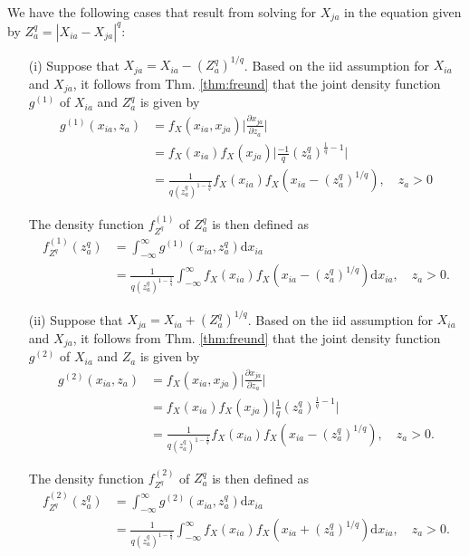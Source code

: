 \documentclass[10pt,letterpaper]{article}\usepackage[]{graphicx}\usepackage[]{color}
\begin{document}
We have the following cases that result from solving for $X_{ja}$ in the equation given by $Z^q_a = |X_{ia} - X_{ja}|^q$:
\begin{itemize}
\item[(i)] Suppose that $X_{ja} = X_{ia} - \left(Z^q_a\right)^{1/q}$. Based on the iid assumption for $X_{ia}$ and $X_{ja}$, it follows from Thm. \ref{thm:freund} that the joint density function $g^{(1)}$ of $X_{ia}$ and $Z^q_a$ is given by
%
\begin{equation}
\begin{aligned}
g^{(1)}(x_{ia},z_a) &= f_X(x_{ia},x_{ja})\biggl|\frac{\partial x_{ja}}{\partial z_a}\biggr| \\
&= f_X(x_{ia})f_X(x_{ja})\biggl|\frac{-1}{q} \left(z^q_a\right)^{\frac{1}{q}-1}\biggr| \\
&= \frac{1}{q \left(z^q_a\right)^{1 - \frac{1}{q}}}f_X(x_{ia})f_X\left(x_{ia}-\left(z^q_a\right)^{1/q}\right), \quad z_a > 0
\end{aligned}
\end{equation}

The density function $f^{(1)}_{Z^q}$ of $Z^q_a$ is then defined as
%
\begin{equation}
\begin{aligned}
f^{(1)}_{Z^q}(z^q_a) &= \int_{-\infty}^{\infty} g^{(1)}(x_{ia},z^q_a)\text{d}x_{ia} \\
&= \frac{1}{q \left(z^q_a\right)^{1 - \frac{1}{q}}}\int_{-\infty}^{\infty} f_X(x_{ia})f_X\left(x_{ia}-\left(z^q_a\right)^{1/q}\right)\text{d}x_{ia}, \quad z_a > 0.
\end{aligned}
\end{equation}

\item[(ii)] Suppose that $X_{ja} = X_{ia} + \left(Z^q_a\right)^{1/q}$. Based on the iid assumption for $X_{ia}$ and $X_{ja}$, it follows from Thm. \ref{thm:freund} that the joint density function $g^{(2)}$ of $X_{ia}$ and $Z_a$ is given by
%
\begin{equation}
\begin{aligned}
g^{(2)}(x_{ia},z_a) &= f_X(x_{ia},x_{ja})\biggl|\frac{\partial x_{ja}}{\partial z_a}\biggr| \\
&= f_X(x_{ia})f_X(x_{ja})\biggl|\frac{1}{q} \left(z^q_a\right)^{\frac{1}{q}-1}\biggr| \\
&= \frac{1}{q \left(z^q_a\right)^{1 - \frac{1}{q}}}f_X(x_{ia})f_X\left(x_{ia}-\left(z^q_a\right)^{1/q}\right), \quad z_a > 0.
\end{aligned}
\end{equation}

The density function $f^{(2)}_{Z^q}$ of $Z^q_a$ is then defined as
%
\begin{equation}
\begin{aligned}
f^{(2)}_{Z^q}(z^q_a) &= \int_{-\infty}^{\infty} g^{(2)}(x_{ia},z^q_a)\text{d}x_{ia} \\
&= \frac{1}{q \left(z^q_a\right)^{1 - \frac{1}{q}}}\int_{-\infty}^{\infty} f_X(x_{ia})f_X\left(x_{ia}+\left(z^q_a\right)^{1/q}\right)\text{d}x_{ia}, \quad z_a > 0.
\end{aligned}
\end{equation}
\end{itemize}
\end{document}
